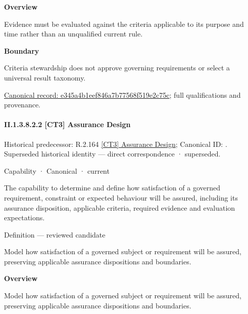 \textbf{Overview}



Evidence must be evaluated against the criteria applicable to its purpose and time rather than an unqualified current rule.



\textbf{Boundary}



Criteria stewardship does not approve governing requirements or select a universal result taxonomy.


{\footnotesize \href{../../../../../../../continuum/strategy/capability/feature/e345a4b1eef846a7b77568f519e2c75c.md}{Canonical record: e345a4b1eef846a7b77568f519e2c75c}; full qualifications and provenance.}\par
\paragraph*{II.1.3.8.2.2 [CT3] Assurance Design}
\label{navigation:II.1.3.8.2.2}

{\small Historical predecessor: R.2.164 \hyperref[element:e1b8db7c95fa4e7ea296351a03532e24]{[CT3] Assurance Design}; Canonical ID: \texttt{}. Superseded historical identity — direct correspondence · superseded.}\par
\label{element:71c8a612b88f4ecba049e94d506bd0c2}
{\small Capability · Canonical · current}\par

The capability to determine and define how satisfaction of a governed requirement, constraint or expected behaviour will be assured, including its assurance disposition, applicable criteria, required evidence and evaluation expectations.



Definition — reviewed candidate



Model how satisfaction of a governed subject or requirement will be assured, preserving applicable assurance dispositions and boundaries.



\textbf{Overview}



Model how satisfaction of a governed subject or requirement will be assured, preserving applicable assurance dispositions and boundaries.



